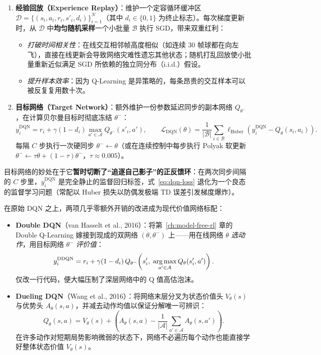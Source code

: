 \begin{defBox}
\begin{definition}
\begin{enumerate}
  \item \textbf{经验回放（Experience Replay）}：维护一个定容循环缓冲区 $\mathcal{D} = \{(s_i, a_i, r_i, s'_i, d_i)\}_{i=1}^N$（其中 $d_i \in \{0, 1\}$ 为终止标志）。每次梯度更新时，从 $\mathcal{D}$ 中\textbf{均匀随机采样}一个小批量 $\mathcal{B}$ 执行 SGD，带来双重红利：
  \begin{itemize}
    \item \emph{打破时间相关性}：在线交互相邻帧高度相似（如连续 30 帧球都在向左飞），直接在线更新会导致网络灾难性遗忘其他状态；随机打乱回放使小批量重新近似满足 SGD 所依赖的独立同分布（i.i.d.）假设。
    \item \emph{提升样本效率}：因为 Q-Learning 是异策略的，每条昂贵的交互样本可以被反复复用数十次。
  \end{itemize}
  \item \textbf{目标网络（Target Network）}：额外维护一份参数延迟同步的副本网络 $Q_{\theta^-}$，在计算贝尔曼目标时彻底冻结 $\theta^-$：
  \begin{equation}
    y_i^{\mathrm{DQN}} = r_i + \gamma (1 - d_i) \max_{a' \in \mathcal{A}} Q_{\theta^-}(s'_i, a'), \qquad
    \mathcal{L}_{\mathrm{DQN}}(\theta) = \frac{1}{|\mathcal{B}|}\sum_{i \in \mathcal{B}} \ell_{\mathrm{Huber}}\!\left(y_i^{\mathrm{DQN}} - Q_\theta(s_i, a_i)\right).
    \label{eq:dqn-loss}
  \end{equation}
  每隔 $C$ 步执行一次硬同步 $\theta^- \leftarrow \theta$（或在连续控制中每步执行 Polyak 软更新 $\theta^- \leftarrow \tau \theta + (1-\tau)\theta^-$，$\tau \approx 0.005$）。
\end{enumerate}
\end{definition}
\end{defBox}

目标网络的妙处在于它\textbf{暂时切断了“追逐自己影子”的正反馈环}：在两次同步间隔的 $C$ 步里，$y_i^{\mathrm{DQN}}$ 是完全静止的监督回归标签，式~\eqref{eq:dqn-loss} 退化为一个良态的监督学习问题（常配以 Huber 损失以防偶发极端 TD 误差引发梯度爆炸）。

在原始 DQN 之上，两项几乎零额外开销的改进成为现代价值网络标配：
\begin{itemize}
  \item \textbf{Double DQN}（van Hasselt et al., 2016）：将第~\ref{ch:model-free-rl} 章的 Double Q-Learning 嫁接到现成的双网络 $(\theta, \theta^-)$ 上——用在线网络 $\theta$ \emph{选动作}，用目标网络 $\theta^-$ \emph{评价值}：
  \[
    y_i^{\mathrm{DDQN}} = r_i + \gamma (1 - d_i)\, Q_{\theta^-}\!\left(s'_i,\; \operatorname*{arg\,max}_{a' \in \mathcal{A}} Q_\theta(s'_i, a')\right).
  \]
  仅改一行代码，便大幅压制了深层网络中的 Q 值高估泡沫。
  \item \textbf{Dueling DQN}（Wang et al., 2016）：将网络末层分叉为状态价值头 $V_\theta(s)$ 与优势头 $A_\theta(s, a)$，并减去动作均值以保证分解唯一可辨识：
  \[
    Q_\theta(s, a) = V_\theta(s) + \left(A_\theta(s, a) - \frac{1}{|\mathcal{A}|}\sum_{a' \in \mathcal{A}} A_\theta(s, a')\right).
  \]
  在许多动作对短期局势影响微弱的状态下，网络不必遍历每个动作也能直接学好整体状态价值 $V_\theta(s)$。
\end{itemize}

